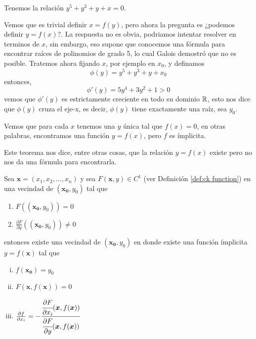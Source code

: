 \begin{example}
    Tenemos la relaci\'on $y^{5}+y^{3}+y+x=0$.
\end{example}

    Vemos que es trivial definir $x=f(y)$, pero ahora la pregunta es ¿podemos
    definir $y=f(x)$?. La respuesta no es obvia, podriamos intentar resolver
    en terminos de $x$, sin embargo, eso supone que conocemos una f\'ormula para encontrar ra\'ices de 
    polinomios de grado 5, lo cual Galois demostró que no es posible. Tratemos
    ahora fijando $x$, por ejemplo en $x_{0}$, y definamos
    $$ \phi(y)=y^{5}+y^{3}+y+x_{0}$$
    entonces,
    $$\phi'(y)=5y^{4}+3y^{2}+1 > 0$$
    vemos que $\phi'(y)$ es estrictamente creciente en todo su dominio $\mathbb{R}$,
    esto nos dice que $\phi(y)$ cruza el eje-x, es decir, $\phi(y)$ tiene exactamente
    una ra\'iz, sea $y_{0}$.

    Vemos que para cada $x$ tenemos una $y$ \'unica tal que $f(x)=0$, en otras
    palabras, encontramos una funci\'on $y=f(x)$, pero $f$ es \'implicita.

    Este teorema nos dice, entre otras cosas, que la relaci\'on $y=f(x)$
    existe pero no nos da una f\'ormula para encontrarla.

\clearpage

\begin{theorem}
    Sea $\bm{x} = (x_{1},x_{2},\ldots,x_{n})$ y sea $F(\bm{x},y) \in C^{1}$ (ver Definici\'on \ref{def:ck function})
    en una vecindad de $(\bm{x_{0}},y_{0})$ tal que
    \begin{enumerate}
        \item $F((\bm{x_{0}},y_{0})) = 0$
        \item $\frac{\partial F}{\partial y}((\bm{x_{0}},y_{0})) \ne 0$
    \end{enumerate}
    entonces existe una vecindad de $(\bm{x_{0}},y_{0})$ en donde existe una
    funci\'on \'implicita $y=f(\bm{x})$ tal que
    \begin{enumerate}[i.]
        \item $f(\bm{x_{0}}) = y_{0}$
        \item $F(\bm{x}, f(\bm{x})) = 0$
        \item $\frac{\partial f}{\partial x_{i}} = -\cfrac{\cfrac{\partial F}{\partial x_{i}}(\bm{x},f(\bm{x}))}{\cfrac{\partial F}{\partial y}(\bm{x},f(\bm{x}))}$
    \end{enumerate}
\end{theorem}

